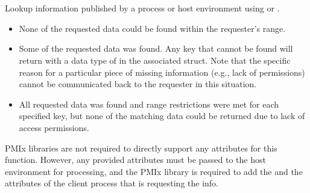 \section{}

\summary

Lookup information published by a process or host environment using  or .

\format


\begin{arglist}
\end{arglist}

\returnstart
\begin{itemize}
\item {} None of the requested data could be found within the requester's range.

\item {} Some of the requested data was found.
Any key that cannot be found will return with a data type of  in the associated  struct. Note that the specific reason for a particular piece of missing information (e.g., lack of permissions) cannot be communicated back to the requester in this situation.

\item {} All requested data was found and range restrictions were met for each specified key, but none of the matching data could be returned due to lack of access permissions.

\end{itemize}
\returnend

\reqattrstart
\ac{PMIx} libraries are not required to directly support any attributes for this function. However, any provided attributes must be passed to the host environment for processing, and the \ac{PMIx} library is required to add the  and the  attributes of the client process that is requesting the info.

